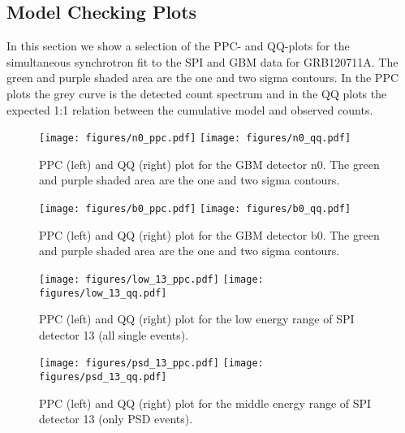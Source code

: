 \documentclass[twocolumn,traditabstract]{aa}
\begin{document}



\begin{appendix}
\onecolumn
  \section{Model Checking Plots}
  \label{appendix}
  In this section we show a selection of the PPC- and QQ-plots for the simultaneous synchrotron fit to the SPI and GBM data for GRB120711A. The green and purple shaded area are the one and two sigma contours. In the PPC plots the grey curve is the detected count spectrum and in the QQ plots the expected 1:1 relation between the cumulative model and observed counts.

  \begin{figure*}[ht]
    \begin{centering}
      \texttt{[image: figures/n0\_ppc.pdf]}
      \texttt{[image: figures/n0\_qq.pdf]}
      \caption{PPC (left) and QQ (right) plot for the GBM detector n0. The green and purple shaded area are the one and two sigma contours.}
      \label{fig:n0_model_check}
    \end{centering}
  \end{figure*}
  \begin{figure*}[ht]
    \begin{centering}
      \texttt{[image: figures/b0\_ppc.pdf]}
      \texttt{[image: figures/b0\_qq.pdf]}
      \caption{PPC (left) and QQ (right) plot for the GBM detector b0. The green and purple shaded area are the one and two sigma contours.}
      \label{fig:b0_model_check}
    \end{centering}
  \end{figure*}

  \begin{figure*}[ht]
    \begin{centering}
      \texttt{[image: figures/low\_13\_ppc.pdf]}
      \texttt{[image: figures/low\_13\_qq.pdf]}
      \caption{PPC (left) and QQ (right) plot for the low energy range of SPI detector 13 (all single events).}
      \label{fig:low_13_model_check}
    \end{centering}
  \end{figure*}

  \begin{figure*}[ht]
    \begin{centering}
      \texttt{[image: figures/psd\_13\_ppc.pdf]}
      \texttt{[image: figures/psd\_13\_qq.pdf]}
      \caption{PPC (left) and QQ (right) plot for the middle energy range of SPI detector 13 (only PSD events).}
      \label{fig:psd_13_model_check}
    \end{centering}
  \end{figure*}
\end{appendix}
\end{document}
